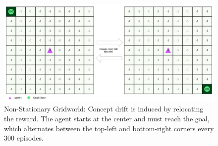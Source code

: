 \begin{figure}[hptb]
    \centering
    \includegraphics[width=\textwidth]{figures/rewards_change}
    \caption{Non-Stationary Gridworld: Concept drift is induced by relocating the reward. The agent starts at the center and must reach the goal, which alternates between the top-left and bottom-right corners every 300 episodes.}
    \label{fig:r-change}
\end{figure}

\endinput

